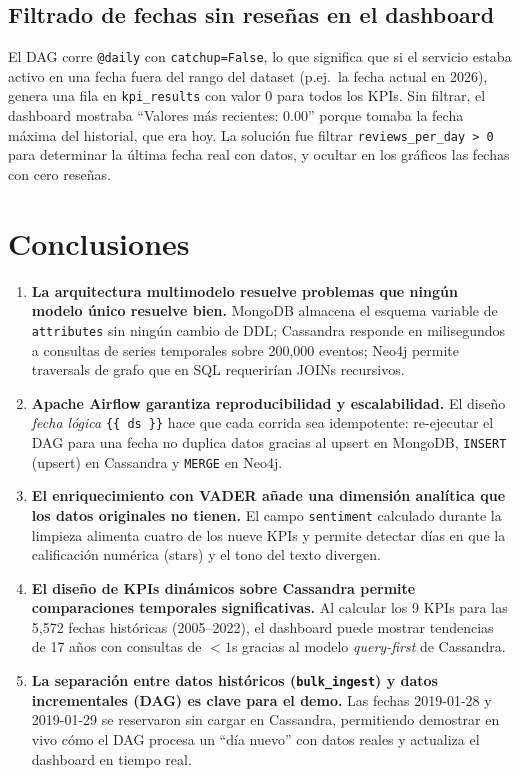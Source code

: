 \documentclass[12pt,a4paper]{article}
\begin{document}
\subsection{Filtrado de fechas sin reseñas en el dashboard}

El DAG corre \texttt{@daily} con \texttt{catchup=False}, lo que significa que si el servicio
estaba activo en una fecha fuera del rango del dataset (p.ej.\ la fecha actual en 2026),
genera una fila en \texttt{kpi\_results} con valor 0 para todos los KPIs. Sin filtrar, el
dashboard mostraba ``Valores más recientes: 0.00'' porque tomaba la fecha máxima del
historial, que era hoy. La solución fue filtrar \texttt{reviews\_per\_day > 0} para determinar
la última fecha real con datos, y ocultar en los gráficos las fechas con cero reseñas.

\section{Conclusiones}

\begin{enumerate}

\item \textbf{La arquitectura multimodelo resuelve problemas que ningún modelo único resuelve bien.}
MongoDB almacena el esquema variable de \texttt{attributes} sin ningún cambio de DDL;
Cassandra responde en milisegundos a consultas de series temporales sobre 200,000 eventos;
Neo4j permite traversals de grafo que en SQL requerirían JOINs recursivos.

\item \textbf{Apache Airflow garantiza reproducibilidad y escalabilidad.}
El diseño \textit{fecha lógica} \texttt{\{\{ ds \}\}} hace que cada corrida sea idempotente:
re-ejecutar el DAG para una fecha no duplica datos gracias al upsert en MongoDB,
\texttt{INSERT} (upsert) en Cassandra y \texttt{MERGE} en Neo4j.

\item \textbf{El enriquecimiento con VADER añade una dimensión analítica que los datos originales no tienen.}
El campo \texttt{sentiment} calculado durante la limpieza alimenta cuatro de los nueve KPIs
y permite detectar días en que la calificación numérica (stars) y el tono del texto divergen.

\item \textbf{El diseño de KPIs dinámicos sobre Cassandra permite comparaciones temporales significativas.}
Al calcular los 9 KPIs para las 5,572 fechas históricas (2005--2022), el dashboard puede
mostrar tendencias de 17 años con consultas de $< 1$s gracias al modelo \textit{query-first}
de Cassandra.

\item \textbf{La separación entre datos históricos (\texttt{bulk\_ingest}) y datos incrementales (DAG)
es clave para el demo.} Las fechas 2019-01-28 y 2019-01-29 se reservaron sin cargar en
Cassandra, permitiendo demostrar en vivo cómo el DAG procesa un ``día nuevo'' con datos
reales y actualiza el dashboard en tiempo real.

\end{enumerate}
\end{document}
